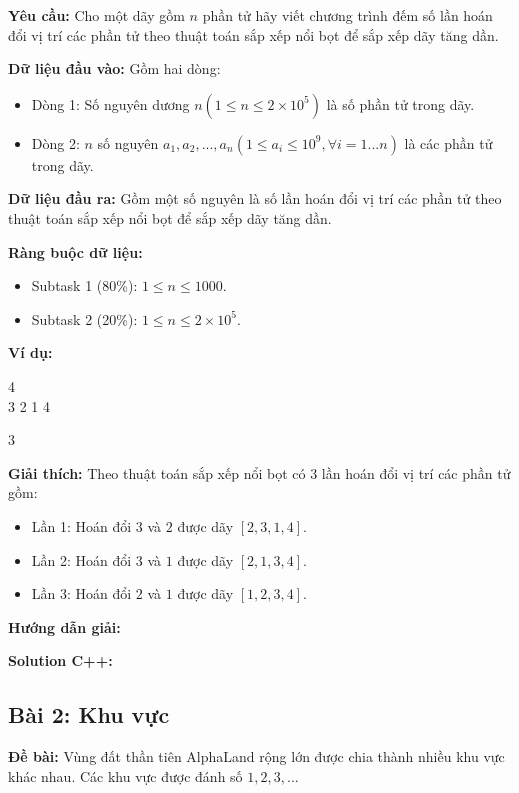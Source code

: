 \documentclass[12pt]{scrartcl}  %
\begin{document}
\textbf{Yêu cầu:}
Cho một dãy gồm $n$ phần tử hãy viết chương trình đếm số lần hoán đổi vị trí các phần tử theo thuật toán sắp xếp nổi bọt để sắp xếp dãy tăng dần. 

\textbf{Dữ liệu đầu vào:}
Gồm hai dòng:
\begin{itemize}
    \item Dòng 1: Số nguyên dương $n (1 \leq n \leq 2 \times 10^5)$ là số phần tử trong dãy.
    \item Dòng 2: $n$ số nguyên $a_1, a_2, ..., a_n (1 \leq a_i \leq 10^9, \forall i = 1 ... n)$ là các phần tử trong dãy.
\end{itemize}

\textbf{Dữ liệu đầu ra:}
Gồm một số nguyên là số lần hoán đổi vị trí các phần tử theo thuật toán sắp xếp nổi bọt để sắp xếp dãy tăng dần.

\textbf{Ràng buộc dữ liệu:}
\begin{itemize}
    \item Subtask 1 (80\%): $1 \leq n \leq 1000$.
    \item Subtask 2 (20\%): $1 \leq n \leq 2 \times 10^5$.
\end{itemize}

\textbf{Ví dụ:}
\begin{tcolorbox}[colback=gray!5!white, colframe=blue!50!black, title=Input]
4\\
3 2 1 4
\end{tcolorbox}

\begin{tcolorbox}[colback=gray!5!white, colframe=green!50!black, title=Output]
3
\end{tcolorbox}

\textbf{Giải thích:}
Theo thuật toán sắp xếp nổi bọt có $3$ lần hoán đổi vị trí các phần tử gồm: 
\begin{itemize}
    \item Lần 1: Hoán đổi $3$ và $2$ được dãy $\left[2, 3, 1, 4\right]$.
    \item Lần 2: Hoán đổi $3$ và $1$ được dãy $\left[2, 1, 3, 4\right]$.
    \item Lần 3: Hoán đổi $2$ và $1$ được dãy $\left[1, 2, 3, 4\right]$.
\end{itemize}

\textbf{Hướng dẫn giải:}

\textbf{Solution C++:}

\subsection{Bài 2: Khu vực}
\textbf{Đề bài:}
Vùng đất thần tiên AlphaLand rộng lớn được chia thành nhiều khu vực khác nhau. Các khu vực được đánh số $1, 2, 3, ...$ 
\end{document}
